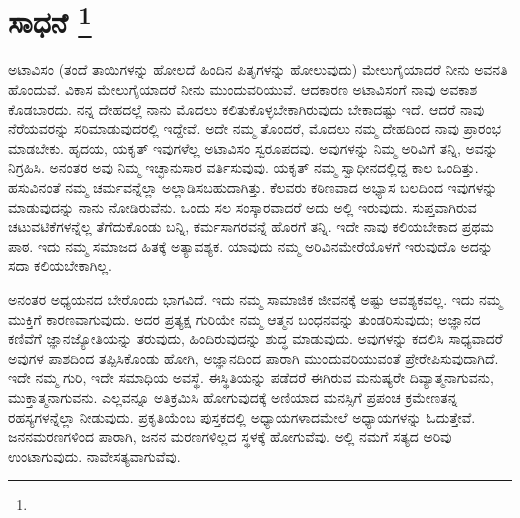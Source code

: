 
\chapter[ಸಾಧನೆ ]{ಸಾಧನೆ \protect\footnote{}}

ಅಟಾವಿಸಂ (ತಂದೆ ತಾಯಿಗಳನ್ನು ಹೋಲದೆ ಹಿಂದಿನ ಪಿತೃಗಳನ್ನು ಹೋಲುವುದು) ಮೇಲುಗೈಯಾದರೆ ನೀನು ಅವನತಿ ಹೊಂದುವೆ. ವಿಕಾಸ ಮೇಲುಗೈಯಾದರೆ ನೀನು ಮುಂದುವರಿಯುವೆ. ಆದಕಾರಣ ಅಟಾವಿಸಂಗೆ ನಾವು ಅವಕಾಶ ಕೊಡಬಾರದು. ನನ್ನ ದೇಹದಲ್ಲೆ ನಾನು ಮೊದಲು ಕಲಿತುಕೊಳ್ಳಬೇಕಾಗಿರುವುದು ಬೇಕಾದಷ್ಟು ಇದೆ. ಆದರೆ ನಾವು ನೆರೆಯವರನ್ನು ಸರಿಮಾಡುವುದರಲ್ಲಿ ಇದ್ದೇವೆ. ಅದೇ ನಮ್ಮ ತೊಂದರೆ, ಮೊದಲು ನಮ್ಮ ದೇಹದಿಂದ ನಾವು ಪ್ರಾರಂಭ ಮಾಡಬೇಕು. ಹೃದಯ, ಯಕೃತ್​ ಇವುಗಳೆಲ್ಲ ಅಟಾವಿಸಂ ಸ್ವರೂಪದವು. ಅವುಗಳನ್ನು ನಿಮ್ಮ ಅರಿವಿಗೆ ತನ್ನಿ, ಅವನ್ನು ನಿಗ್ರಹಿಸಿ. ಅನಂತರ ಅವು ನಿಮ್ಮ ಇಚ್ಛಾನುಸಾರ ವರ್ತಿಸುವುವು. ಯಕೃತ್​ ನಮ್ಮ ಸ್ವಾಧೀನದಲ್ಲಿದ್ದ ಕಾಲ ಒಂದಿತ್ತು. ಹಸುವಿನಂತೆ ನಮ್ಮ ಚರ್ಮವನ್ನೆಲ್ಲಾ ಅಲ್ಲಾಡಿಸಬಹುದಾಗಿತ್ತು. ಕೆಲವರು ಕಠಿಣವಾದ ಅಭ್ಯಾಸ ಬಲದಿಂದ ಇವುಗಳನ್ನು ಮಾಡುವುದನ್ನು ನಾನು ನೋಡಿರುವೆನು. ಒಂದು ಸಲ ಸಂಸ್ಕಾರವಾದರೆ ಅದು ಅಲ್ಲಿ ಇರುವುದು. ಸುಪ್ತವಾಗಿರುವ ಚಟುವಟಿಕೆಗಳನ್ನೆಲ್ಲ ತೆಗೆದುಕೊಂಡು ಬನ್ನಿ, ಕರ್ಮಸಾಗರವನ್ನೆ ಹೊರಗೆ ತನ್ನಿ. ಇದೇ ನಾವು ಕಲಿಯಬೇಕಾದ ಪ್ರಥಮ ಪಾಠ. ಇದು ನಮ್ಮ ಸಮಾಜದ ಹಿತಕ್ಕೆ ಅತ್ಯಾವಶ್ಯಕ. ಯಾವುದು ನಮ್ಮ ಅರಿವಿನ\break ಮೇರೆಯೊಳಗೆ ಇರುವುದೊ ಅದನ್ನು ಸದಾ ಕಲಿಯಬೇಕಾಗಿಲ್ಲ.

ಅನಂತರ ಅಧ್ಯಯನದ ಬೇರೊಂದು ಭಾಗವಿದೆ. ಇದು ನಮ್ಮ ಸಾಮಾಜಿಕ ಜೀವನಕ್ಕೆ ಅಷ್ಟು ಆವಶ್ಯಕವಲ್ಲ. ಇದು ನಮ್ಮ ಮುಕ್ತಿಗೆ ಕಾರಣವಾಗುವುದು. ಅದರ ಪ್ರತ್ಯಕ್ಷ ಗುರಿಯೇ ನಮ್ಮ ಆತ್ಮನ ಬಂಧನವನ್ನು ತುಂಡರಿಸುವುದು; ಅಜ್ಞಾನದ ಕಣಿವೆಗೆ ಜ್ಞಾನಜ್ಯೋತಿಯನ್ನು ತರುವುದು, ಹಿಂದಿರುವುದನ್ನು ಶುದ್ಧ ಮಾಡುವುದು. ಅವುಗಳನ್ನು ಕದಲಿಸಿ ಸಾಧ್ಯವಾದರೆ ಅವುಗಳ ಪಾಶದಿಂದ ತಪ್ಪಿಸಿಕೊಂಡು ಹೋಗಿ, ಅಜ್ಞಾನದಿಂದ ಪಾರಾಗಿ ಮುಂದುವರಿಯುವಂತೆ ಪ್ರೇರೇಪಿಸುವುದಾಗಿದೆ. ಇದೇ ನಮ್ಮ ಗುರಿ, ಇದೇ ಸಮಾಧಿಯ ಅವಸ್ಥೆ. ಈ\break ಸ್ಥಿತಿಯನ್ನು ಪಡೆದರೆ ಈಗಿರುವ ಮನುಷ್ಯರೇ ದಿವ್ಯಾತ್ಮನಾಗುವನು, ಮುಕ್ತಾತ್ಮನಾಗುವನು. ಎಲ್ಲವನ್ನೂ ಅತಿಕ್ರಮಿಸಿ ಹೋಗುವುದಕ್ಕೆ ಅಣಿಯಾದ ಮನಸ್ಸಿಗೆ ಪ್ರಪಂಚ ಕ್ರಮೇಣ\break ತನ್ನ ರಹಸ್ಯಗಳನ್ನೆಲ್ಲಾ ನೀಡುವುದು. ಪ್ರಕೃತಿಯೆಂಬ ಪುಸ್ತಕದಲ್ಲಿ ಅಧ್ಯಾಯಗಳಾದ\break ಮೇಲೆ ಅಧ್ಯಾಯಗಳನ್ನು ಓದುತ್ತೇವೆ. ಜನನಮರಣಗಳಿಂದ ಪಾರಾಗಿ, ಜನನ ಮರಣಗಳಿಲ್ಲದ ಸ್ಥಳಕ್ಕೆ ಹೋಗುವೆವು. ಅಲ್ಲಿ ನಮಗೆ ಸತ್ಯದ ಅರಿವು ಉಂಟಾಗುವುದು. ನಾವೇ\break ಸತ್ಯವಾಗುವೆವು.

\eject

